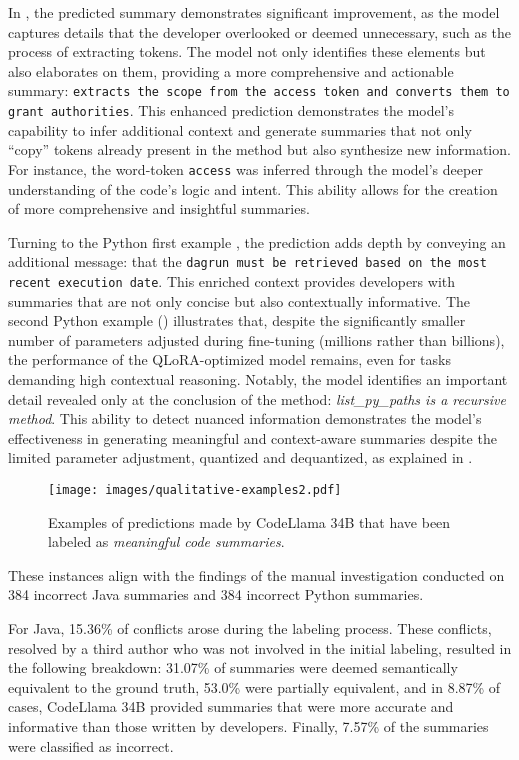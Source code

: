 
In , the predicted summary demonstrates significant improvement, as the model captures details that the developer overlooked or deemed unnecessary, such as the process of extracting tokens. The model not only identifies these elements but also elaborates on them, providing a more comprehensive and actionable summary: \texttt{extracts the scope from the access token and converts them to grant authorities}. This enhanced prediction demonstrates the model’s capability to infer additional context and generate summaries that not only ``copy'' tokens already present in the method but also synthesize new information. For instance, the word-token \texttt{access} was inferred through the model’s deeper understanding of the code’s logic and intent. This ability allows for the creation of more comprehensive and insightful summaries.


Turning to the Python first example , the prediction adds depth by conveying an additional message: that the \texttt{dagrun must be retrieved based on the most recent execution date}.  This enriched context provides developers with summaries that are not only concise but also contextually informative.
The second Python example () illustrates that, despite the significantly smaller number of parameters adjusted during fine-tuning (\ie millions rather than billions), the performance of the QLoRA-optimized model remains, even for tasks demanding high contextual reasoning. Notably, the model identifies an important detail revealed only at the conclusion of the method: \emph{list\_py\_paths is a recursive method}. This ability to detect nuanced information demonstrates the model’s effectiveness in generating meaningful and context-aware summaries despite the limited parameter adjustment, quantized and dequantized, as explained in .


\begin{figure}[t!]
	\centering
	\texttt{[image: images/qualitative-examples2.pdf]}
	\caption{Examples of predictions made by CodeLlama 34B that have been labeled as \emph{meaningful code summaries}. }
	\label{fig:qualitative-examples}
\end{figure}

These instances align with the findings of the manual investigation conducted on 384 incorrect Java summaries and 384 incorrect Python summaries.

For Java, 15.36\% of conflicts arose during the labeling process. These conflicts, resolved by a third author who was not involved in the initial labeling, resulted in the following breakdown: 31.07\% of summaries were deemed semantically equivalent to the ground truth, 53.0\% were partially equivalent, and in 8.87\% of cases, CodeLlama 34B provided summaries that were more accurate and informative than those written by developers. Finally, 7.57\% of the summaries were classified as incorrect.

